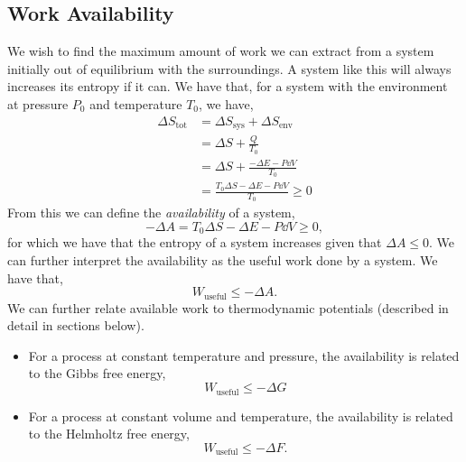 \documentclass{book}
\begin{document}
\subsection{Work Availability}
We wish to find the maximum amount of work we can extract from a system initially out of equilibrium with the surroundings. A system like this will always increases its entropy if it can. We have that, for a system with the environment at pressure $P_0$ and temperature $T_0$, we have,
\begin{equation}
	\begin{split}
		\Delta S_{\text{tot}} & = \Delta S_{\text{sys}} + \Delta S_{\text{env}} \\
		& = \Delta S + \frac{Q}{T_0} \\
		& = \Delta S + \frac{-\Delta E - P\dd{V}}{T_0} \\
		& = \frac{T_0 \Delta S - \Delta E - P\dd{V}}{T_0} \geq 0
	\end{split}
\end{equation}
From this we can define the \textit{availability} of a system,
\begin{equation}
	- \Delta A = T_0 \Delta S - \Delta E - P\dd{V} \geq 0,
\end{equation}
for which we have that the entropy of a system increases given that $\Delta A \leq 0$. We can further interpret the availability as the useful work done by a system. We have that,
\begin{equation}
	\boxed{W_{\text{useful}} \leq -\Delta A}.
\end{equation}
We can further relate available work to thermodynamic potentials (described in detail in sections below).
\begin{itemize}
	\item For a process at constant temperature and pressure, the availability is related to the Gibbs free energy,
	\begin{equation}
		\boxed{W_{\text{useful}} \leq -\Delta G}
	\end{equation}
	\item For a process at constant volume and temperature, the availability is related to the Helmholtz free energy,
	\begin{equation}
		\boxed{W_{\text{useful}} \leq -\Delta F}.
	\end{equation}
\end{itemize}
\end{document}
